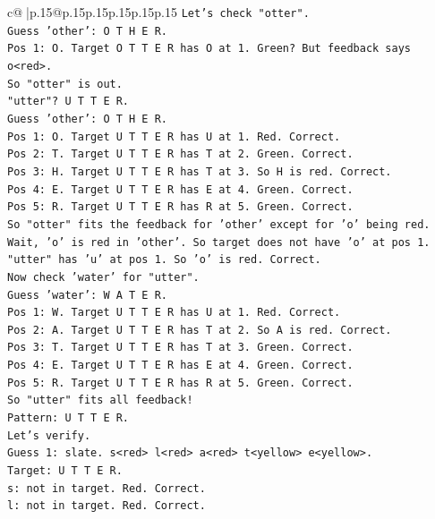\documentclass{article}
\begin{document}
{\begin{supertabular}{c@{$\;$}|p{.15\linewidth}@{}p{.15\linewidth}p{.15\linewidth}p{.15\linewidth}p{.15\linewidth}p{.15\linewidth}}
{{{\texttt{Let's check "otter".} \\
\texttt{Guess 'other': O T H E R.} \\
\texttt{Pos 1: O. Target O T T E R has O at 1. Green? But feedback says o<red>.} \\
\texttt{So "otter" is out.} \\
\texttt{"utter"? U T T E R.} \\
\texttt{Guess 'other': O T H E R.} \\
\texttt{Pos 1: O. Target U T T E R has U at 1. Red. Correct.} \\
\texttt{Pos 2: T. Target U T T E R has T at 2. Green. Correct.} \\
\texttt{Pos 3: H. Target U T T E R has T at 3. So H is red. Correct.} \\
\texttt{Pos 4: E. Target U T T E R has E at 4. Green. Correct.} \\
\texttt{Pos 5: R. Target U T T E R has R at 5. Green. Correct.} \\
\texttt{So "otter" fits the feedback for 'other' except for 'o' being red.} \\
\texttt{Wait, 'o' is red in 'other'. So target does not have 'o' at pos 1.} \\
\texttt{"utter" has 'u' at pos 1. So 'o' is red. Correct.} \\
\texttt{Now check 'water' for "utter".} \\
\texttt{Guess 'water': W A T E R.} \\
\texttt{Pos 1: W. Target U T T E R has U at 1. Red. Correct.} \\
\texttt{Pos 2: A. Target U T T E R has T at 2. So A is red. Correct.} \\
\texttt{Pos 3: T. Target U T T E R has T at 3. Green. Correct.} \\
\texttt{Pos 4: E. Target U T T E R has E at 4. Green. Correct.} \\
\texttt{Pos 5: R. Target U T T E R has R at 5. Green. Correct.} \\
\texttt{So "utter" fits all feedback!} \\
\texttt{Pattern: U T T E R.} \\
\texttt{Let's verify.} \\
\texttt{Guess 1: slate. s<red> l<red> a<red> t<yellow> e<yellow>.} \\
\texttt{Target: U T T E R.} \\
\texttt{s: not in target. Red. Correct.} \\
\texttt{l: not in target. Red. Correct.} \\
}}}
\end{supertabular}}
\end{document}
